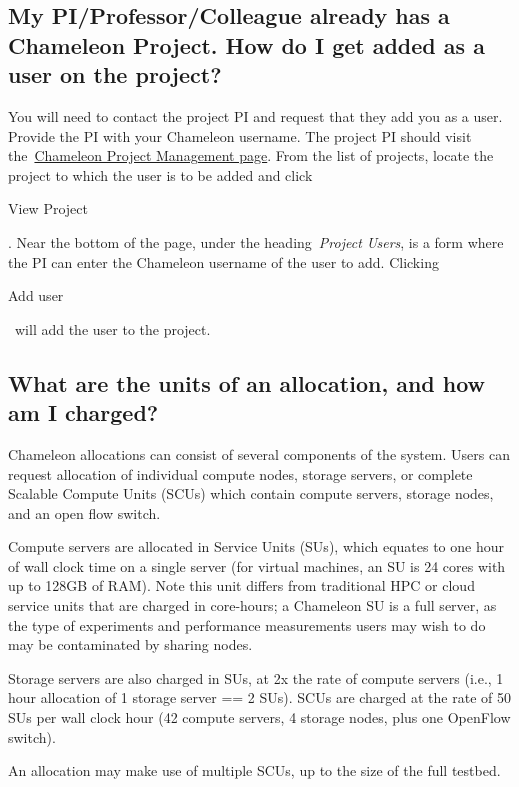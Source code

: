 \subsection{My PI/Professor/Colleague already has a Chameleon Project.
How do I get added as a user on the
project?}\label{my-piprofessorcolleague-already-has-a-chameleon-project.-how-do-i-get-added-as-a-user-on-the-project}

You will need to contact the project PI and request that they add you as
a user. Provide the PI with your Chameleon username. The project PI
should visit
the~\href{https://www.chameleoncloud.org/user/projects}{Chameleon
Project Management page}. From the list of projects, locate the project
to which the user is to be added and click

View Project

. Near the bottom of the page, under the heading~\emph{Project Users},
is a form where the PI can enter the Chameleon username of the user to
add. Clicking

Add user

~will add the user to the project.

\subsection{What are the units of an allocation, and how am I
charged?}\label{what-are-the-units-of-an-allocation-and-how-am-i-charged}

Chameleon allocations can consist of several components of the system.
Users can request allocation of individual compute nodes, storage
servers, or complete Scalable Compute Units (SCUs) which contain compute
servers, storage nodes, and an open flow switch.

Compute servers are allocated in Service Units (SUs), which equates to
one hour of wall clock time on a single server (for virtual machines, an
SU is 24 cores with up to 128GB of RAM). Note this unit differs from
traditional HPC or cloud service units that are charged in core-hours; a
Chameleon SU is a full server, as the type of experiments and
performance measurements users may wish to do may be contaminated by
sharing nodes.

Storage servers are also charged in SUs, at 2x the rate of compute
servers (i.e., 1 hour allocation of 1 storage server == 2 SUs). SCUs are
charged at the rate of 50 SUs per wall clock hour (42 compute servers, 4
storage nodes, plus one OpenFlow switch).

An allocation may make use of multiple SCUs, up to the size of the full
testbed.

